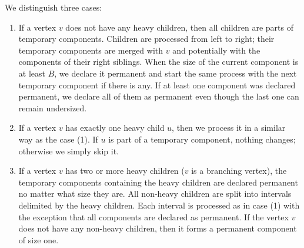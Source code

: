 We distinguish three cases:
\begin{enumerate}
	\item If a vertex $v$ does not have any heavy children, then all children are parts of temporary components.
	Children are processed from left to right; their temporary components are merged with $v$ and potentially with the components of their right siblings.
	When the size of the current component is at least $B$, we declare it permanent and start the same process with the next temporary component if there is any.
	If at least one component was declared permanent, we declare all of them as permanent even though the last one can remain undersized.
	
	\item If a vertex $v$ has exactly one heavy child $u$, then we process it in a similar way as the case (1).
	If $u$ is part of a temporary component, nothing changes; otherwise we simply skip it.
	
	\item If a vertex $v$ has two or more heavy children ($v$ is a branching vertex), the temporary components containing the heavy children are declared permanent no matter what size they are.
	All non-heavy children are split into intervals delimited by the heavy children.
	Each interval is processed as in case (1) with the exception that all components are declared as permanent.
	If the vertex $v$ does not have any non-heavy children, then it forms a permanent component of size one.
\end{enumerate}

